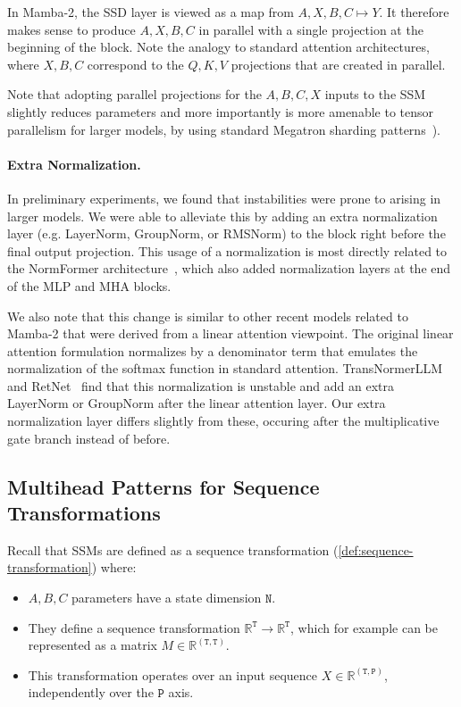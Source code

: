 In Mamba-2, the SSD layer is viewed as a map from $A, X, B, C \mapsto Y$. It therefore makes sense to produce $A, X, B, C$ in parallel with a single projection at the beginning of the block. Note the analogy to standard attention architectures, where $X, B, C$ correspond to the $Q, K, V$ projections that are created in parallel.

Note that adopting parallel projections for the $A, B, C, X$ inputs to the SSM slightly reduces parameters and more importantly is more amenable to tensor parallelism for larger models, by using standard Megatron sharding patterns~\citep{shoeybi2019megatron}).

\paragraph{Extra Normalization.}

In preliminary experiments, we found that instabilities were prone to arising in larger models. We were able to alleviate this by adding an extra normalization layer (e.g. LayerNorm, GroupNorm, or RMSNorm) to the block right before the final output projection. This usage of a normalization is most directly related to the NormFormer architecture~\citep{shleifer2021normformer}, which also added normalization layers at the end of the MLP and MHA blocks.

We also note that this change is similar to other recent models related to Mamba-2 that were derived from a linear attention viewpoint. The original linear attention formulation normalizes by a denominator term that emulates the normalization of the softmax function in standard attention.
TransNormerLLM~\citep{qin2023transnormerllm} and RetNet~\citep{sun2023retentive} find that this normalization is unstable and add an extra LayerNorm or GroupNorm after the linear attention layer. Our extra normalization layer differs slightly from these, occuring after the multiplicative gate branch instead of before.

\subsection{Multihead Patterns for Sequence Transformations}
\label{sec:architecture:multihead}

Recall that SSMs are defined as a sequence transformation (\ref{def:sequence-transformation})
where:

\begin{itemize}
  \item $A, B, C$ parameters have a state dimension $\mathtt{N}$.
  \item They define a sequence transformation $\mathbb{R}^\mathtt{T} \to \mathbb{R}^\mathtt{T}$, which for example can be represented as a matrix $M \in \mathbb{R}^{\mathtt{(T, T)}}$.
  \item This transformation operates over an input sequence $X \in \mathbb{R}^{\mathtt{(T, P)}}$, independently over the $\mathtt{P}$ axis.
\end{itemize}

